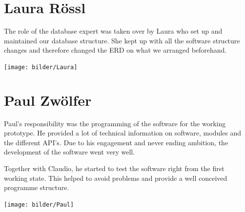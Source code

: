 \section*{Laura Rössl}
The role of the database expert was taken over by Laura who set up and maintained our database structure. She kept up with all the software structure changes and therefore changed the ERD on what we arranged beforehand. 
\begin{center}
\texttt{[image: bilder/Laura]}
\end{center}
\section*{Paul Zwölfer}
Paul's responsibility was the programming of the software for the working prototype. He provided a lot of technical information on software, modules and the different API's. Due to his engagement and never ending ambition, the development of the software went very well.

Together with Claudio, he started to test the software right from the first working state. This helped to avoid problems and provide a well conceived programme structure.
\begin{center}
\texttt{[image: bilder/Paul]}
\end{center}